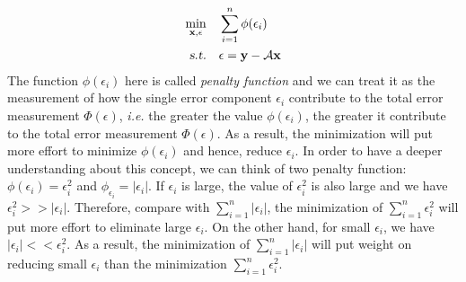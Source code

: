 \documentclass[10pt,a4paper]{article}
\begin{document}
\begin{equation*}
	\begin{aligned}
		\displaystyle\min_{\mathbf{x}, \epsilon} \quad & \displaystyle\sum_{i = 1}^{n} \phi(\epsilon_{i}) \\
		\textsl{s.t.} \quad & \epsilon = \mathbf{y} - \mathcal{A} \mathbf{x}
	\end{aligned} 
\end{equation*}
The function $\phi(\epsilon_{i})$ here is called \textit{penalty function} and we can treat it as the measurement of how the single error component $\epsilon_{i}$ contribute to the total error measurement $\Phi(\epsilon)$, \textsl{i.e.} the greater the value $\phi(\epsilon_{i})$, the greater it contribute to the total error measurement $\Phi(\epsilon)$. As a result, the minimization will put more effort to minimize $\phi(\epsilon_{i})$ and hence, reduce $\epsilon_{i}$. In order to have a deeper understanding about this concept, we can think of two penalty function: $\phi(\epsilon_{i}) = \epsilon_{i}^{2}$ and $\phi_{\epsilon_{i}} = |\epsilon_{i}|$. If $\epsilon_{i}$ is large, the value of $\epsilon_{i}^{2}$ is also large and we have $\epsilon_{i}^{2} >> |\epsilon_{i}|$. Therefore, compare with $\displaystyle\sum_{i = 1}^{n} |\epsilon_{i}|$, the minimization of $\displaystyle\sum_{i = 1}^{n} \epsilon_{i}^{2}$ will put more effort to eliminate large $\epsilon_{i}$. On the other hand, for small $\epsilon_{i}$, we have $|\epsilon_{i}| << \epsilon_{i}^{2}$. As a result, the minimization of $\displaystyle\sum_{i = 1}^{n} |\epsilon_{i}|$ will put weight on reducing small $\epsilon_{i}$ than the minimization $\displaystyle\sum_{i = 1}^{n} \epsilon_{i}^{2}$.
\end{document}
